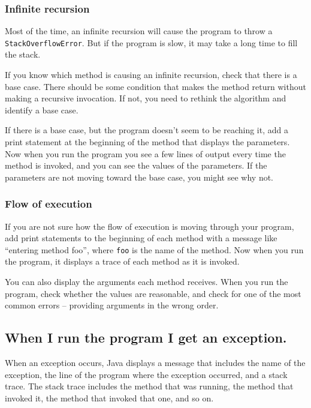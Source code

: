 \documentclass[12pt]{book}
\theoremstyle{exercise}
\newcommand{\java}[1]{\verb"#1"}
\begin{document}
\subsubsection*{Infinite recursion}

Most of the time, an infinite recursion will cause the program to throw a \java{StackOverflowError}.
But if the program is slow, it may take a long time to fill the stack.

If you know which method is causing an infinite recursion, check that there is a base case.
There should be some condition that makes the method return without making a recursive invocation.
If not, you need to rethink the algorithm and identify a base case.

If there is a base case, but the program doesn't seem to be reaching it, add a print statement at the beginning of the method that displays the parameters.
Now when you run the program you see a few lines of output every time the method is invoked, and you can see the values of the parameters.
If the parameters are not moving toward the base case, you might see why not.


\subsubsection*{Flow of execution}


If you are not sure how the flow of execution is moving through your program, add print statements to the beginning of each method with a message like ``entering method foo'', where \java{foo} is the name of the method.
Now when you run the program, it displays a trace of each method as it is invoked.

You can also display the arguments each method receives.
When you run the program, check whether the values are reasonable, and check for one of the most common errors -- providing arguments in the wrong order.


\subsection*{When I run the program I get an exception.}


When an exception occurs, Java displays a message that includes the name of the exception, the line of the program where the exception occurred, and a stack trace.
The stack trace includes the method that was running, the method that invoked it, the method that invoked that one, and so on.
\end{document}
